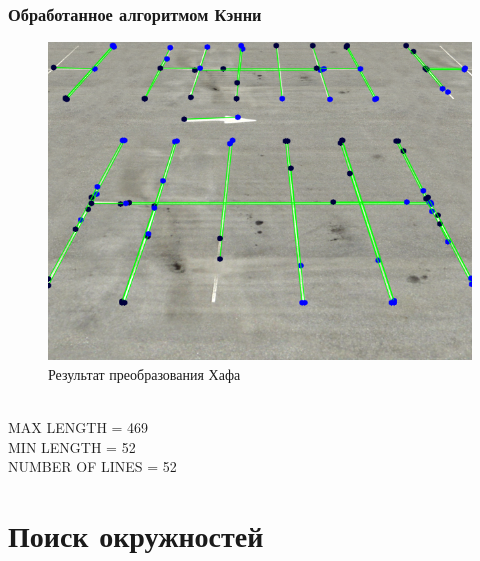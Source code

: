 \subsubsection{Обработанное алгоритмом Кэнни}

\begin{figure}[H]
    \includegraphics[width=\textwidth]{../outputs/image3_canny.png}
    \caption{Результат преобразования Хафа}
    \label{fig:image3_canny}
\end{figure}
\ \\
MAX LENGTH = 469 \\
MIN LENGTH = 52 \ \\
NUMBER OF LINES = 52

\section{Поиск окружностей}

